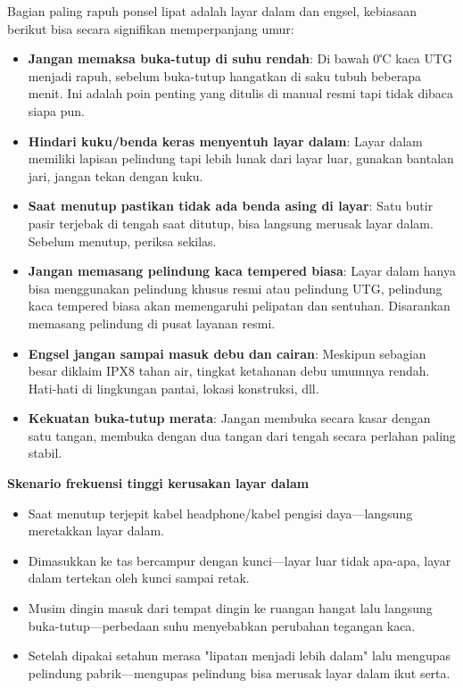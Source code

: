 
Bagian paling rapuh ponsel lipat adalah layar dalam dan engsel, kebiasaan berikut bisa secara signifikan memperpanjang umur:

\begin{itemize}
  \item \textbf{Jangan memaksa buka-tutup di suhu rendah}: Di bawah 0℃ kaca UTG menjadi rapuh, sebelum buka-tutup hangatkan di saku tubuh beberapa menit. Ini adalah poin penting yang ditulis di manual resmi tapi tidak dibaca siapa pun.
  \item \textbf{Hindari kuku/benda keras menyentuh layar dalam}: Layar dalam memiliki lapisan pelindung tapi lebih lunak dari layar luar, gunakan bantalan jari, jangan tekan dengan kuku.
  \item \textbf{Saat menutup pastikan tidak ada benda asing di layar}: Satu butir pasir terjebak di tengah saat ditutup, bisa langsung merusak layar dalam. Sebelum menutup, periksa sekilas.
  \item \textbf{Jangan memasang pelindung kaca tempered biasa}: Layar dalam hanya bisa menggunakan pelindung khusus resmi atau pelindung UTG, pelindung kaca tempered biasa akan memengaruhi pelipatan dan sentuhan. Disarankan memasang pelindung di pusat layanan resmi.
  \item \textbf{Engsel jangan sampai masuk debu dan cairan}: Meskipun sebagian besar diklaim IPX8 tahan air, tingkat ketahanan debu umumnya rendah. Hati-hati di lingkungan pantai, lokasi konstruksi, dll.
  \item \textbf{Kekuatan buka-tutup merata}: Jangan membuka secara kasar dengan satu tangan, membuka dengan dua tangan dari tengah secara perlahan paling stabil.
\end{itemize}

\textbf{Skenario frekuensi tinggi kerusakan layar dalam}\par

\begin{itemize}
  \item Saat menutup terjepit kabel headphone/kabel pengisi daya—langsung meretakkan layar dalam.
  \item Dimasukkan ke tas bercampur dengan kunci—layar luar tidak apa-apa, layar dalam tertekan oleh kunci sampai retak.
  \item Musim dingin masuk dari tempat dingin ke ruangan hangat lalu langsung buka-tutup—perbedaan suhu menyebabkan perubahan tegangan kaca.
  \item Setelah dipakai setahun merasa "lipatan menjadi lebih dalam" lalu mengupas pelindung pabrik—mengupas pelindung bisa merusak layar dalam ikut serta.
\end{itemize}

